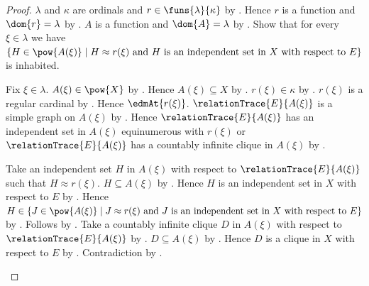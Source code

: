 \begin{proof}
    $\lambda$ and $\kappa$ are ordinals and
        $r\in\funs{\lambda}{\kappa}$ by
        .
    Hence $r$ is a function and $\dom{r}=\lambda$ by
        .
    $A$ is a function and $\dom{A}=\lambda$ by
        .
    Show that for every $\xi\in\lambda$ we have
        $\{H\in\pow{A(\xi)}\mid
            \text{$H\approx r(\xi)$ and $H$ is an independent set in $X$
                with respect to $E$}\}$
        is inhabited.
    \begin{subproof}
        Fix $\xi\in\lambda$.
        $A(\xi)\in\pow{X}$ by .
        Hence $A(\xi)\subseteq X$ by .
        $r(\xi)\in\kappa$ by .
        $r(\xi)$ is a regular cardinal by
            .
        Hence $\edmAt{r(\xi)}$.
        $\relationTrace{E}{A(\xi)}$ is a simple graph on $A(\xi)$ by
            .
        Hence $\relationTrace{E}{A(\xi)}$ has an independent set in $A(\xi)$
                equinumerous with $r(\xi)$ or
            $\relationTrace{E}{A(\xi)}$ has a countably infinite clique
                in $A(\xi)$ by
            .
        \begin{byCase}
                Take an independent set $H$ in $A(\xi)$ with respect to
                    $\relationTrace{E}{A(\xi)}$ such that $H\approx r(\xi)$.
                $H\subseteq A(\xi)$ by .
                Hence $H$ is an independent set in $X$ with respect to $E$
                    by .
                Hence $H\in\{J\in\pow{A(\xi)}\mid
                    \text{$J\approx r(\xi)$ and
                        $J$ is an independent set in $X$
                        with respect to $E$}\}$ by
                    .
                Follows by \auto.
                Take a countably infinite clique $D$ in $A(\xi)$ with respect to
                    $\relationTrace{E}{A(\xi)}$ by \auto.
                $D\subseteq A(\xi)$ by .
                Hence $D$ is a clique in $X$ with respect to $E$ by
                    .
                Contradiction by \auto.

\end{byCase}
\end{subproof}
\end{proof}

